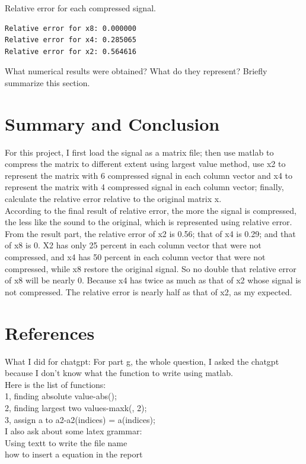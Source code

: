 \documentclass{article}
\begin{document}
Relative error for each compressed signal.
\begin{verbatim}
Relative error for x8: 0.000000
Relative error for x4: 0.285065
Relative error for x2: 0.564616
\end{verbatim}
What numerical results were obtained?
What do they represent?
Briefly summarize this section.

\section{Summary and Conclusion}
For this project, I first load the signal as a matrix file; then use matlab to compress the matrix to different extent using largest value method, use x2 to represent the matrix with 6 compressed signal in each column vector and x4 to represent the matrix with 4 compressed signal in each column vector; finally, calculate the relative error relative to the original matrix x. \\
According to the final result of relative error, the more the signal is compressed, the less like the sound to the original, which is represented using relative error. From the result part, the relative error of x2 is 0.56; that of x4 is 0.29; and that of x8 is 0. X2 has only 25 percent in each column vector that were not compressed, and x4 has 50 percent in each column vector that were not compressed, while x8 restore the original signal. So no double that relative error of x8 will be nearly 0. Because x4 has twice as much as that of x2 whose signal is not compressed. The relative error is nearly half as that of x2, as my expected.  


\section{References}
What I did for chatgpt:
For part g, the whole question, I asked the chatgpt because I don't know what the function to write using matlab.\\
Here is the list of functions:\\
1, finding absolute value-abs();\\
2, finding largest two values-maxk(, 2);\\
3, assign a to a2-a2(indices) = a(indices);\\
I also ask about some latex grammar:\\
Using textt to write the file name\\
how to insert a equation in the report\\
\end{document}
